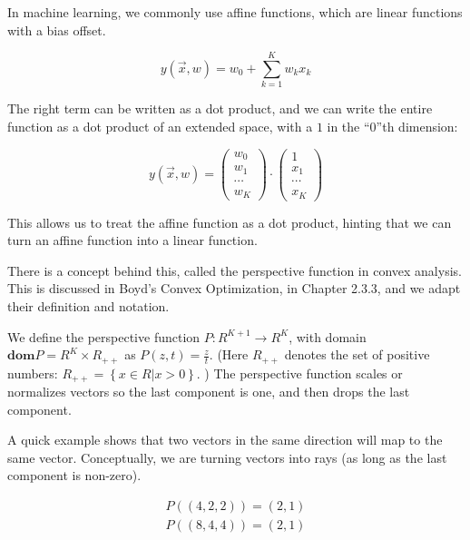 \documentclass[a4paper]{article}
\begin{document}
In machine learning, we commonly use affine functions, which are linear functions with a bias offset.

\begin{equation}
  y(\vec{x},w) = w_0 + \sum_{k=1}^K w_k x_k
  \label{}
\end{equation}

The right term can be written as a dot product, and we can write the entire function as a dot product of an extended space, with a $1$ in the ``$0$''th dimension:

\begin{equation}
  y(\vec{x},w) = 
    \begin{pmatrix}
      w_0 \\ w_1 \\ \cdots \\ w_K
    \end{pmatrix}
    \cdot
    \begin{pmatrix}
      1 \\ x_1 \\ \cdots \\ x_K
     \end{pmatrix}
  \label{}
\end{equation}

This allows us to treat the affine function as a dot product, hinting that we can turn an affine function into a linear function.

There is a concept behind this, called the perspective function in convex analysis. This is discussed in Boyd's Convex Optimization, in Chapter 2.3.3, and we adapt their definition and notation.

  We define the perspective function $P: R^{K+1} \rightarrow R^K$, with domain $\textbf{dom} P = R^K \times R_{++}$ as $P(z,t) = \frac{z}{t}$. (Here $R_{++}$ denotes the set of positive numbers: $R_{++} = \left\{ x \in R \vert x > 0 \right\} $. )  The perspective function scales or normalizes vectors so the last component is one, and then drops the last component.

A quick example shows that two vectors in the same direction will map to the same vector. Conceptually, we are turning vectors into rays (as long as the last component is non-zero).

\begin{equation}
  \begin{split}
    P\left( (4,2,2) \right) = (2,1) \\
    P\left( (8,4,4) \right) = (2,1) 
  \end{split}
  \label{}
\end{equation}
\end{document}
